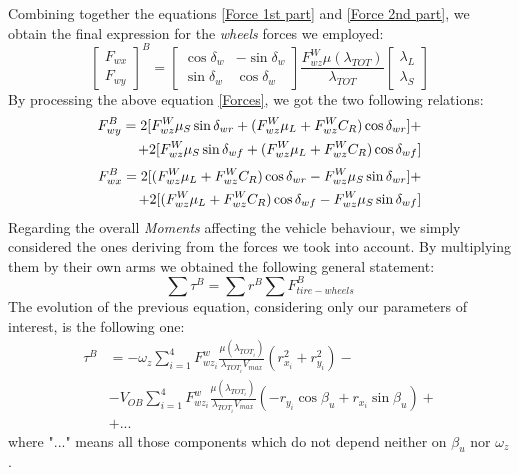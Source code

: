 Combining together the equations \ref{Force 1st part} and \ref{Force 2nd part}, we obtain the final expression for the \textit{wheels} forces we employed:
\begin{equation} \label{Forces}
\begin{bmatrix}
F_{wx} \\
F_{wy}
\end{bmatrix}^{B} =	
\begin{bmatrix}
\cos\delta_{w} & -\sin\delta_{w} \\
\sin\delta_{w} & \cos\delta_{w}
\end{bmatrix}
\frac{F_{wz}^{W} \mu(\lambda_{TOT})}{\lambda_{TOT}}
\begin{bmatrix}
\lambda_{L} \\
\lambda_{S}
\end{bmatrix}
\end{equation}
By processing the above equation \ref{Forces}, we got the two following relations:
\begin{equation} \label{F_{wy}}
\begin{split}
F_{wy}^{B} = 2 [F_{wz}^{W} \mu_{S}\sin\delta_{wr} + (F_{wz}^{W} \mu_{L} + F_{wz}^{W} C_{R}) \cos\delta_{wr}] + \\ + 2 [F_{wz}^{W} \mu_{S}\sin\delta_{wf} + (F_{wz}^{W} \mu_{L} + F_{wz}^{W} C_{R})\cos\delta_{wf}] 
\end{split}
\end{equation}
\begin{equation} \label{F_{wx}}
\begin{split}
F_{wx}^{B} = 2 [(F_{wz}^{W} \mu_{L} + F_{wz}^{W} C_{R})\cos\delta_{wr} - F_{wz}^{W} \mu_{S}\sin\delta_{wr}] + \\ + 2 [(F_{wz}^{W} \mu_{L} + F_{wz}^{W} C_{R})\cos\delta_{wf} - F_{wz}^{W} \mu_{S}\sin\delta_{wf}] 
\end{split}
\end{equation}
Regarding the overall \textit{Moments} affecting the vehicle behaviour, we simply considered the ones deriving from the forces we took into account. By multiplying them by their own arms we obtained the following general statement:
\begin{equation}
\sum \tau^{B} = \sum r^{B} \sum F_{tire-wheels}^{B}
\end{equation}
The evolution of the previous equation, considering only our parameters of interest, is the following one:  
\begin{equation}
\begin{split}
\tau^{B} &= -\omega_{z}\sum_{i=1}^{4} F_{wz_{i}}^{w} \frac{\mu(\lambda_{TOT_{i}})}{\lambda_{TOT_{i}} V_{max}} (r_{x_{i}}^{2} + r_{y_{i}}^{2})- \\ &- V_{OB}\sum_{i=1}^{4} F_{wz_{i}}^{w} \frac{\mu(\lambda_{TOT_{i}})}{\lambda_{TOT_{i}} V_{max}} (- r_{y_{i}} \cos \beta_{u} + r_{x_{i}} \sin\beta_{u})+ \\ &+ ... 
\end{split}	
\end{equation}
where "$ ... $" means all those components which do not depend neither on $\beta_{u}$ nor $\omega_{z}$.
